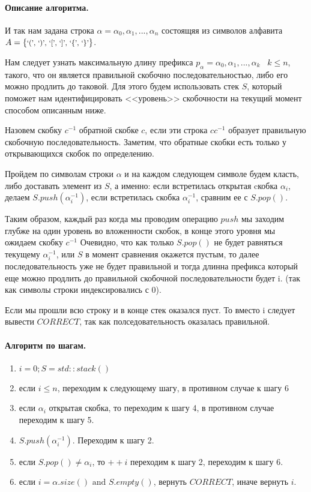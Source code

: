 \documentclass[12pt]{article}
\begin{document}
\paragraph{Описание алгоритма.}
И так нам задана строка $ \alpha = \alpha_0, \alpha_1, ..., \alpha_n$ состоящяя
из символов алфавита 
$ A = \left\{ 
    \mbox{\footnotesize{`(', `)', `[', `]', `\{', `\}'}}
\right\} $.

Нам следует узнать максимальную длину префикса $ p_{\alpha} = \alpha_0, \alpha_1, ..., \alpha_k \;\;\; k \le n$, такого, что он является
правильной скобочно последовательностью, либо его можно продлить до таковой. Для этого будем использовать стек $ S $,
который поможет нам идентифицировать <<уровень>> скобочности на текущий момент способом
описанным ниже.

Назовем скобку $ c^{-1} $ обратной скобке $ c $, если эти строка $ cc^{-1} $ образует правильную скобочную последовательность.
Заметим, что обратные скобки есть только у открывающихся скобок по определению.

Пройдем по символам строки $ \alpha $ и на каждом следующем символе будем класть, либо доставать элемент из $ S $, а именно:
если встретилась открытая cкобка $ \alpha_i $, делаем $ S.push(\alpha_i^{-1}) $, если встретилась скобка $\alpha_i^{-1}$, сравним ее 
с $ S.pop() $.

Таким образом, каждый раз когда мы проводим операцию $ push $ мы заходим глубже на один уровень во вложенности скобок, в
конце этого уровня мы ожидаем скобку $ c^{-1} $
Очевидно, что как только $ S.pop() $ не будет равняться текущему $ \alpha_i^{-1} $, или $ S $ в момент сравнения окажется пустым, 
то далее последовательность уже не будет правильной и тогда длинна префикса который еще можно продлить до правильной скобочной 
последовательности будет i. (так как символы строки индексировались с 0).

Если мы прошли всю строку и в конце стек оказался пуст. То вместо i следует вывести $ CORRECT $, так как полседовательность оказалась правильной.


\paragraph{Алгоритм по шагам.}
\begin{enumerate}
    \item $i = 0; S = std::stack() $
    \item если $ i \le n $, переходим к следующему шагу, в противном случае к шагу 6
    \item если $ \alpha_i $ открытая скобка, то переходим к шагу 4, в противном случае переходим к шагу 5.
    \item $ S.push(\alpha_i^{-1}) $. Переходим к шагу 2.
    \item если $ S.pop() \ne \alpha_i $, то $ ++i $ переходим к шагу 2, переходим к шагу 6.
    \item если $ i = \alpha.size() \mbox{ and } S.empty() $, вернуть $ CORRECT $, иначе вернуть $ i $.
\end{enumerate}
\end{document}
